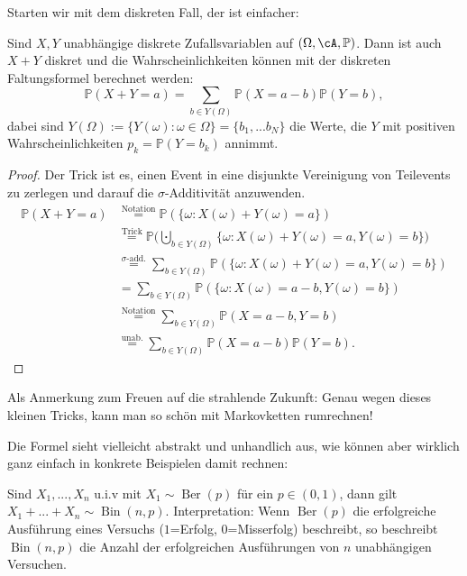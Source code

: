 Starten wir mit dem diskreten Fall, der ist einfacher:
\begin{satz}\label{diskreteFaltung}
	Sind $X,Y$ unabhängige diskrete Zufallsvariablen auf $(\Omega, \cA, \mathbb{P})$. Dann ist auch $X+Y$ diskret und die Wahrscheinlichkeiten k\"onnen mit der diskreten Faltungsformel berechnet werden:
	\[ \mathbb{P}(X+Y = a) = \sum\limits_{b \in Y(\Omega)} \mathbb{P}(X = a-b) \mathbb{P}(Y=b),
	\]
	dabei sind $Y(\Omega) := \{ Y(\omega): \omega \in \Omega\}=\{b_1,...b_N\}$ die Werte, die $Y$ mit positiven Wahrscheinlichkeiten $p_k=\mathbb P(Y=b_k)$ annimmt.
\end{satz}

\begin{proof}
	Der Trick ist es, einen Event in eine disjunkte Vereinigung von Teilevents zu zerlegen und darauf die $\sigma$-Additivit\"at anzuwenden.
	\begin{align*}
		\mathbb{P}(X+Y = a) &\overset{\text{Notation}}{=} \mathbb{P}(\{ \omega\colon X(\omega) + Y(\omega) = a \}) \\
		&\overset{\text{Trick}}{=} \mathbb{P}\Big(\bigcupdot_{b \in Y(\Omega)} \{ \omega\colon X(\omega) + Y(\omega) = a, Y(\omega) = b \} \Big)\\
		&\overset{\sigma\text{-add.}}{=} \sum\limits_{b \in Y(\Omega)} \mathbb{P}(\{ \omega\colon X(\omega) + Y(\omega) = a, Y(\omega) = b \})\\ 
		&= \sum\limits_{b \in Y(\Omega)} \mathbb{P}(\{ \omega\colon X(\omega) = a - b, Y(\omega) = b \})\\
		&\overset{\text{Notation}}{=} \sum\limits_{b \in Y(\Omega)} \mathbb{P}(X = a - b, Y = b )\\
		& \overset{\text{unab.}}{=} \sum\limits_{b \in Y(\Omega)} \mathbb{P}(X=a-b) \mathbb{P}(Y=b).
	\end{align*}
\end{proof}
Als Anmerkung zum Freuen auf die strahlende Zukunft: Genau wegen dieses kleinen Tricks, kann man so sch\"on mit Markovketten rumrechnen!\smallskip

Die Formel sieht vielleicht abstrakt und unhandlich aus, wie k\"onnen aber wirklich ganz einfach in konkrete Beispielen damit rechnen:



\begin{beispiel}
	Sind $X_1,...,X_n$ u.i.v mit $X_1 \sim \operatorname{Ber}(p)$ f\"ur ein $p\in (0,1)$, dann gilt $X_1+...+X_n \sim \operatorname{Bin}(n,p)$. Interpretation: Wenn $\operatorname{Ber}(p)$ die erfolgreiche Ausf\"uhrung eines Versuchs ($1$=Erfolg, $0$=Misserfolg) beschreibt, so beschreibt $\operatorname{Bin}(n,p)$ die Anzahl der erfolgreichen Ausf\"uhrungen von $n$ unabhängigen Versuchen.
\end{beispiel}

